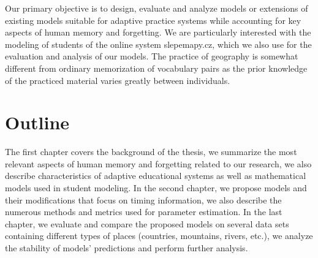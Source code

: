 Our primary objective is to design, evaluate and analyze models or extensions of existing models suitable for adaptive practice systems while accounting for key aspects of human memory and forgetting. We are particularly interested with the modeling of students of the online system slepemapy.cz, which we also use for the evaluation and analysis of our models. The practice of geography is somewhat different from ordinary memorization of vocabulary pairs as the prior knowledge of the practiced material varies greatly between individuals.

\section{Outline}

The first chapter covers the background of the thesis, we summarize the most relevant aspects of human memory and forgetting related to our research, we also describe characteristics of adaptive educational systems as well as mathematical models used in student modeling. In the second chapter, we propose models and their modifications that focus on timing information, we also describe the numerous methods and metrics used for parameter estimation. In the last chapter, we evaluate and compare the proposed models on several data sets containing different types of places (countries, mountains, rivers, etc.), we analyze the stability of models' predictions and perform further analysis.
